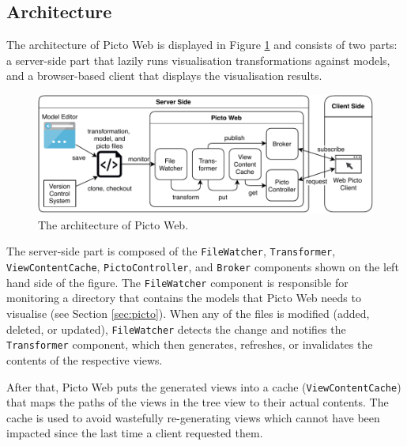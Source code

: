 \documentclass[sigconf,review]{acmart}
\begin{document}
\subsection{Architecture}
\label{sec:architecture}

The architecture of Picto Web is displayed in Figure \ref{fig:architecture} and consists of two parts: a server-side part that lazily runs visualisation transformations against models, and a browser-based client that displays the visualisation results. 


\begin{figure}[h]
  \centering
  \includegraphics[width=\linewidth]{images/architecture.pdf}
  \caption{The architecture of Picto Web.}
  \label{fig:architecture}
\end{figure}

The server-side part is composed of the \texttt{FileWatcher}, \texttt{Transformer}, \texttt{ViewContentCache}, \texttt{PictoController}, and \texttt{Broker} components shown on the left hand side of the figure. The \texttt{FileWatcher} component is responsible for monitoring a directory that contains the models that Picto Web needs to visualise (see Section \ref{sec:picto}). When any of the files is modified (added, deleted, or updated), \texttt{FileWatcher} detects the change and notifies the \texttt{Transformer} component, which then generates, refreshes, or invalidates the contents of the respective views. 

After that, Picto Web puts the generated views into a cache (\texttt{ViewContentCache}) that maps the paths of the views in the tree view to their actual contents. The cache is used to avoid wastefully re-generating views which cannot have been impacted since the last time a client requested them.
\end{document}
